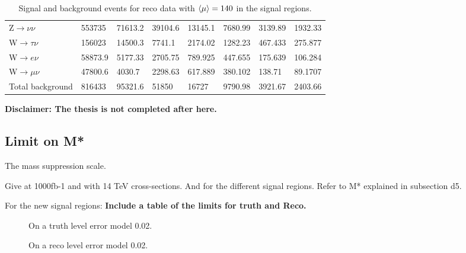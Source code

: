 \begin{landscape}
\begin{table}[ht]
\begin{center}
\begin{tabular}{|l|l|l|l|l|l|l|l|}
Z$\rightarrow\nu\nu$ & 553735 & 71613.2 & 39104.6 & 13145.1 & 7680.99 & 3139.89 & 1932.33 \\
W$\rightarrow\tau\nu$ & 156023 & 14500.3 & 7741.1 & 2174.02 & 1282.23 & 467.433 & 275.877 \\
W$\rightarrow e\nu$ & 58873.9 & 5177.33 & 2705.75 & 789.925 & 447.655 & 175.639 & 106.284 \\
W$\rightarrow\mu\nu$ & 47800.6 & 4030.7 & 2298.63 & 617.889 & 380.102 & 138.71 & 89.1707 \\ \hline
Total background & 816433 & 95321.6 & 51850 & 16727 & 9790.98 & 3921.67 & 2403.66 \\ \hline
\end{tabular}
\caption{Signal and background events for reco data with $\left<\mu\right>=140$ in the signal regions.}
\label{tab:srreco1}
\end{center}
\end{table}
\end{landscape}

\textbf{Disclaimer: The thesis is not completed after here.}

\subsection{Limit on M*}\label{sec:res:subsec:m*}
The mass suppression scale.

Give at 1000fb-1 and with 14 TeV cross-sections. And for the different signal regions.
Refer to M* explained in subsection d5. 

For the new signal regions: \textbf{Include a table of the limits for truth and Reco.}
 \begin{figure}[H] %
    \hfill
    \caption{On a truth level error model 0.02.}
    \label{fig:SRnewMt}
  \end{figure}

 \begin{figure}[H] %
    \hfill
    \caption{On a reco level error model 0.02.}
    \label{fig:SRnewMr}
  \end{figure}


